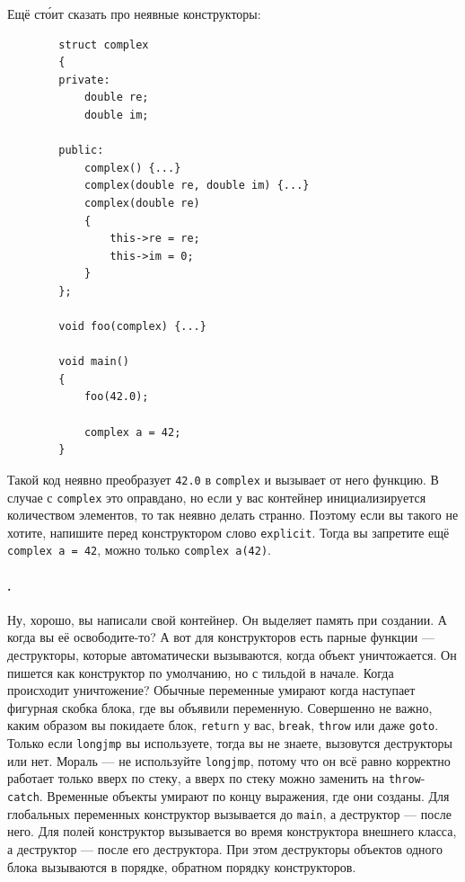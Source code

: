 \documentclass{article}
\begin{document}
    Ещё ст\'{о}ит сказать про неявные конструкторы:
    \begin{verbatim}
        struct complex
        {
        private:
            double re;
            double im;
            
        public:
            complex() {...}
            complex(double re, double im) {...}
            complex(double re)
            {
                this->re = re;
                this->im = 0;
            }
        };

        void foo(complex) {...}

        void main()
        {
            foo(42.0);

            complex a = 42;
        }
    \end{verbatim}
    Такой код неявно преобразует \texttt{42.0} в \texttt{complex} и вызывает от него функцию. В случае с \texttt{complex} это оправдано, но если у вас контейнер инициализируется количеством элементов, то так неявно делать странно. Поэтому если вы такого не хотите, напишите перед конструктором слово \texttt{explicit}. Тогда вы запретите ещё \texttt{complex a = 42}, можно только \texttt{complex a(42)}.
    \paragraph{.}
    Ну, хорошо, вы написали свой контейнер. Он выделяет память при создании. А когда вы её освободите-то? А вот для конструкторов есть парные функции --- деструкторы, которые автоматически вызываются, когда объект уничтожается. Он пишется как конструктор по умолчанию, но с тильдой в начале. Когда происходит уничтожение? Обычные переменные умирают когда наступает фигурная скобка блока, где вы объявили переменную. Совершенно не важно, каким образом вы покидаете блок, \texttt{return} у вас, \texttt{break}, \texttt{throw} или даже \texttt{goto}. Только если \texttt{longjmp} вы используете, тогда вы не знаете, вызовутся деструкторы или нет. Мораль --- не используйте \texttt{longjmp}, потому что он всё равно корректно работает только вверх по стеку, а вверх по стеку можно заменить на \texttt{throw}-\texttt{catch}. Временные объекты умирают по концу выражения, где они созданы. Для глобальных переменных конструктор вызывается до \texttt{main}, а деструктор --- после него. Для полей конструктор вызывается во время конструктора внешнего класса, а деструктор --- после его деструктора. При этом деструкторы объектов одного блока вызываются в порядке, обратном порядку конструкторов.
\end{document}
